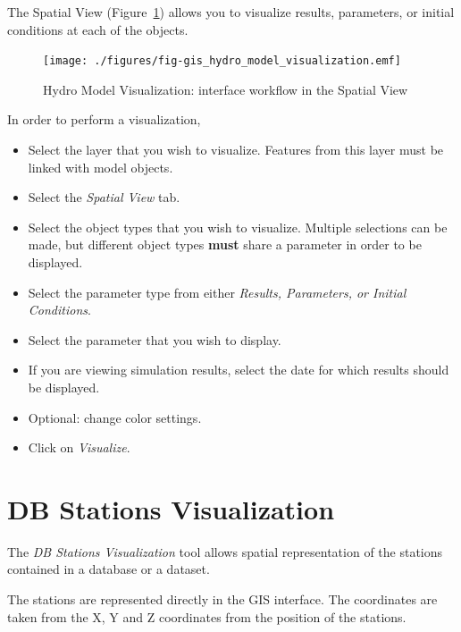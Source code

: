 \documentclass[
  letterpaper,
  DIV=11,
  numbers=noendperiod]{scrreprt}
\begin{document}
The Spatial View (Figure~\ref{fig-gis_hydro_model_visualization}) allows
you to visualize results, parameters, or initial conditions at each of
the objects.

\begin{figure}

{\centering \texttt{[image: ./figures/fig-gis\_hydro\_model\_visualization.emf]}

}

\caption{\label{fig-gis_hydro_model_visualization}Hydro Model
Visualization: interface workflow in the Spatial View}

\end{figure}

In order to perform a visualization,

\begin{itemize}
\item
  {Select the layer that you wish to visualize. Features from this layer
  must be linked with model objects.}
\item
  {Select the \emph{Spatial View} tab.}
\item
  {Select the object types that you wish to visualize. Multiple
  selections can be made, but different object types \textbf{must} share
  a parameter in order to be displayed.}
\item
  {Select the parameter type from either \emph{Results, Parameters, or
  Initial Conditions}.}
\item
  {Select the parameter that you wish to display.}
\item
  {If you are viewing simulation results, select the date for which
  results should be displayed.}
\item
  {Optional: change color settings.}
\item
  {Click on \emph{Visualize}.}
\end{itemize}

\hypertarget{db-stations-visualization}{%
\chapter{DB Stations Visualization}\label{db-stations-visualization}}

The \emph{DB Stations Visualization} tool allows spatial representation
of the stations contained in a database or a dataset.

The stations are represented directly in the GIS interface. The
coordinates are taken from the X, Y and Z coordinates from the position
of the stations.
\end{document}
